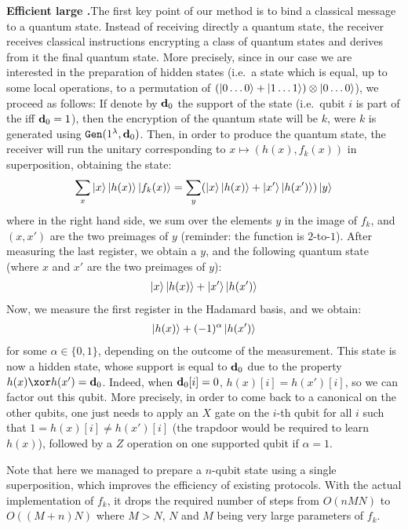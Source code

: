 \noindent\textbf{Efficient large \RSP{}.}\quad The first key point of our method is to bind a classical message to a quantum state. Instead of receiving directly a quantum state, the receiver receives classical instructions encrypting a class of quantum states and derives from it the final quantum state. More precisely, since in our case we are interested in the preparation of hidden \GHZ{} states (i.e.\ a state which is equal, up to some local operations, to a permutation of $(\ket{0 \dots 0} + \ket{1 \dots 1})\otimes \ket{0 \dots 0}$), we proceed as follows: If denote by $\mathbf{d}_0$  the support of the \GHZ{} state (i.e.\ qubit $i$ is part of the \GHZ{} iff $\mathbf{d}_0 = 1$), then the encryption of the quantum state will be $k$, were $k$ is generated using ${\tt Gen}(1^\lambda, \mathbf{d}_0)$. Then, in order to produce the quantum state, the receiver will run the unitary corresponding to $x \mapsto (h(x), f_k(x))$ in superposition, obtaining the state:
\begin{align}
  \sum_x \ket{x}\ket{h(x)}\ket{f_k(x)} = \sum_y (\ket{x}\ket{h(x)} + \ket{x'}\ket{h(x')})\ket{y}
\end{align}
where in the right hand side, we sum over the elements $y$ in the image of $f_k$, and $(x,x')$ are the two preimages of $y$ (reminder: the function is $2$-to-$1$). After measuring the last register, we obtain a $y$, and the following quantum state (where $x$ and $x'$ are the two preimages of $y$):
\begin{align}
  \ket{x}\ket{h(x)}+\ket{x'}\ket{h(x')}
\end{align}
Now, we measure the first register in the Hadamard basis, and we obtain:
\begin{align}
  \ket{h(x)}+(-1)^\alpha\ket{h(x')}
\end{align}
for some $\alpha \in \{0,1\}$, depending on the outcome of the measurement. This state is now a hidden \GHZ{} state, whose support is equal to $\mathbf{d}_0$ due to the property $h(x) \xor h(x') = \vect{d}_0$. Indeed, when $\mathbf{d}_0[i] = 0$, $h(x)[i] = h(x')[i]$, so we can factor out this qubit. More precisely, in order to come back to a canonical \GHZ{} on the other qubits, one just needs to apply an $X$ gate on the $i$-th qubit for all $i$ such that $1=h(x)[i] \neq h(x')[i]$ (the trapdoor would be required to learn $h(x)$), followed by a $Z$ operation on one supported qubit if $\alpha = 1$.

Note that here we managed to prepare a $n$-qubit state using a single superposition, which improves the efficiency of existing \RSP{} protocols. With the actual implementation of $f_k$, it drops the required number of steps from $O(nMN)$ to $O((M+n)N)$ where $M > N$, $N$ and $M$ being very large parameters of $f_k$.\\

